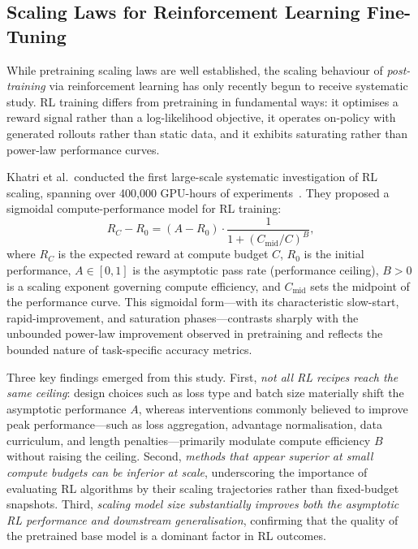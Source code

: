 \subsection{Scaling Laws for Reinforcement Learning Fine-Tuning}

While pretraining scaling laws are well established, the scaling behaviour of
\emph{post-training} via reinforcement learning has only recently begun to
receive systematic study.  RL training differs from pretraining in fundamental
ways: it optimises a reward signal rather than a log-likelihood objective, it
operates on-policy with generated rollouts rather than static data, and it
exhibits saturating rather than power-law performance curves.

Khatri et al.\ conducted the first large-scale systematic investigation of RL
scaling, spanning over 400,000 GPU-hours of
experiments~\cite{khatri2025scaling}.  They proposed a sigmoidal
compute-performance model for RL training:
\begin{equation}
  R_C - R_0 = (A - R_0) \cdot \frac{1}{1 + (C_{\text{mid}} / C)^B},
  \label{eq:rl-sigmoid}
\end{equation}
where $R_C$ is the expected reward at compute budget $C$, $R_0$ is the initial
performance, $A \in [0,1]$ is the asymptotic pass rate (performance ceiling),
$B > 0$ is a scaling exponent governing compute efficiency, and $C_{\text{mid}}$
sets the midpoint of the performance curve.  This sigmoidal form---with its
characteristic slow-start, rapid-improvement, and saturation phases---contrasts
sharply with the unbounded power-law improvement observed in pretraining and
reflects the bounded nature of task-specific accuracy metrics.

Three key findings emerged from this study.  First, \emph{not all RL recipes
reach the same ceiling}: design choices such as loss type and batch size
materially shift the asymptotic performance $A$, whereas interventions commonly
believed to improve peak performance---such as loss aggregation, advantage
normalisation, data curriculum, and length penalties---primarily modulate compute
efficiency $B$ without raising the ceiling.  Second, \emph{methods that appear
superior at small compute budgets can be inferior at scale}, underscoring the
importance of evaluating RL algorithms by their scaling trajectories rather than
fixed-budget snapshots.  Third, \emph{scaling model size substantially improves
both the asymptotic RL performance and downstream generalisation}, confirming
that the quality of the pretrained base model is a dominant factor in RL
outcomes.

